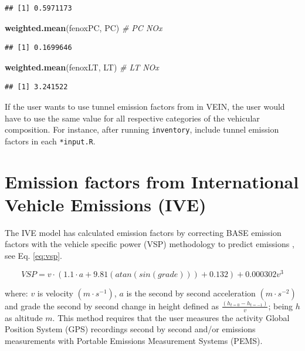\documentclass[12pt,graybox,envcountchap,sectrefs]{krantz}
\makeatletter
\newenvironment{Shaded}{\begin{snugshade}}{\end{snugshade}}
\newcommand{\KeywordTok}[1]{\textcolor[rgb]{0.13,0.29,0.53}{\textbf{#1}}}
\newcommand{\CommentTok}[1]{\textcolor[rgb]{0.56,0.35,0.01}{\textit{#1}}}
\newcommand{\NormalTok}[1]{#1}
\newenvironment{kframe}{%
\medskip{}
\setlength{\fboxsep}{.8em}
 \def\at@end@of@kframe{}%
 \ifinner\ifhmode%
  \def\at@end@of@kframe{\end{minipage}}%
  \begin{minipage}{\columnwidth}%
 \fi\fi%
 \def\FrameCommand##1{\hskip\@totalleftmargin \hskip-\fboxsep
 \colorbox{shadecolor}{##1}\hskip-\fboxsep
     \hskip-\linewidth \hskip-\@totalleftmargin \hskip\columnwidth}%
 \MakeFramed {\advance\hsize-\width
   \@totalleftmargin\z@ \linewidth\hsize
   \@setminipage}}%
 {\par\unskip\endMakeFramed%
 \at@end@of@kframe}
\renewenvironment{Shaded}{\begin{kframe}}{\end{kframe}}
\theoremstyle{definition}
\theoremstyle{definition}
\theoremstyle{definition}
\theoremstyle{remark}
\makeatother
\begin{document}
\begin{verbatim}
## [1] 0.5971173
\end{verbatim}

\begin{Shaded}
\begin{Highlighting}[]
\KeywordTok{weighted.mean}\NormalTok{(fenoxPC, PC) }\CommentTok{# PC NOx }
\end{Highlighting}
\end{Shaded}

\begin{verbatim}
## [1] 0.1699646
\end{verbatim}

\begin{Shaded}
\begin{Highlighting}[]
\KeywordTok{weighted.mean}\NormalTok{(fenoxLT, LT) }\CommentTok{# LT NOx}
\end{Highlighting}
\end{Shaded}

\begin{verbatim}
## [1] 3.241522
\end{verbatim}

If the user wants to use tunnel emission factors from
\citet{perez2014emission} in VEIN, the user would have to use the same
value for all respective categories of the vehicular composition. For
instance, after running \texttt{inventory}, include tunnel emission
factors in each \texttt{*input.R}.

\section{Emission factors from International Vehicle Emissions
(IVE)}\label{emission-factors-from-international-vehicle-emissions-ive}

The IVE model has calculated emission factors by correcting BASE
emission factors with the vehicle specific power (VSP) methodology to
predict emissions \citep{jimenez1999vehicle}, see Eq. \eqref{eq:vsp}.

\begin{equation}
VSP = v \cdot (1.1 \cdot a + 9.81(atan(sin(grade))) + 0.132) + 0.000302v^3
\label{eq:vsp}
\end{equation}

where: \(v\) is velocity \((m \cdot s^{-1})\), \(a\) is the second by
second acceleration \((m \cdot s^{-2})\) and grade the second by second
change in height defined as \(\frac{(h_{t=0} - h_{t=-1})}{v}\); being
\(h\) as altitude \(m\). This method requires that the user measures the
activity Global Position System (GPS) recordings second by second and/or
emissions measurements with Portable Emissions Measurement Systems
(PEMS).
\end{document}
